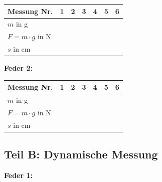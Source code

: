 \documentclass[11pt,a4paper]{scrartcl}
\begin{document}
\begin{center}
	\renewcommand{\arraystretch}{2.0}
	\begin{tabular}{|p{2.5cm}|p{1.5cm}|p{1.5cm}|p{1.5cm}|p{1.5cm}|p{1.5cm}|p{1.5cm}|}
		\hline
		\textbf{Messung Nr.} & \centering\textbf{1} & \centering\textbf{2} & \centering\textbf{3} & \centering\textbf{4} & \centering\textbf{5} & \centering\arraybackslash\textbf{6} \\
		\hline
		$m$ in g & & & & & & \\
		\hline
		$F = m \cdot g$ in N & & & & & & \\
		\hline
		$s$ in cm & & & & & & \\
		\hline
	\end{tabular}
\end{center}

\textbf{Feder 2:}

\begin{center}
	\renewcommand{\arraystretch}{2.0}
	\begin{tabular}{|p{2.5cm}|p{1.5cm}|p{1.5cm}|p{1.5cm}|p{1.5cm}|p{1.5cm}|p{1.5cm}|}
		\hline
		\textbf{Messung Nr.} & \centering\textbf{1} & \centering\textbf{2} & \centering\textbf{3} & \centering\textbf{4} & \centering\textbf{5} & \centering\arraybackslash\textbf{6} \\
		\hline
		$m$ in g & & & & & & \\
		\hline
		$F = m \cdot g$ in N & & & & & & \\
		\hline
		$s$ in cm & & & & & & \\
		\hline
	\end{tabular}
\end{center}



\subsection*{Teil B: Dynamische Messung}

\textbf{Feder 1:}
\end{document}
